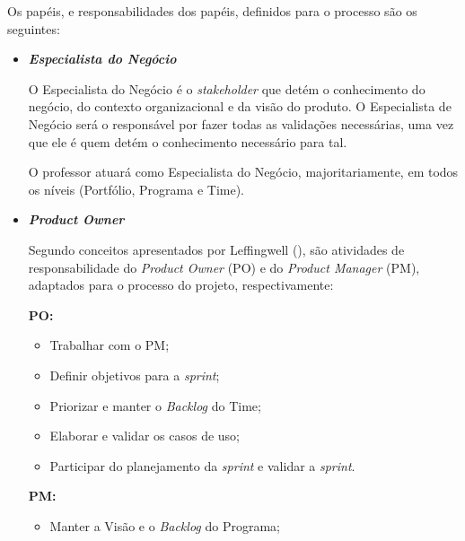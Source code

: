 
  Os papéis, e responsabilidades dos papéis, definidos para o processo são os seguintes:
  
  \begin{itemize}
   
   \item \textbf{\textit{Especialista do Negócio}}
   
      O Especialista do Negócio é o \textit{stakeholder} que detém o conhecimento do negócio, do contexto organizacional
      e da visão do produto. O Especialista de Negócio será o responsável por fazer todas as validações necessárias, uma vez que
      ele é quem detém o conhecimento necessário para tal.
      
      O professor atuará como Especialista do Negócio, majoritariamente, em todos os níveis (Portfólio, Programa e Time).
   
   \item \textbf{\textit{Product Owner}}
      
      Segundo conceitos apresentados por Leffingwell (\citeyear{leffingwell11}),
      são atividades de responsabilidade do \textit{Product Owner} (PO) e do \textit{Product Manager} (PM), 
      adaptados para o processo do projeto, respectivamente:
      
      \textbf{PO:}
      
      \begin{itemize}
       
       \item Trabalhar com o PM;
       
       \item Definir objetivos para a \textit{sprint};
       
       \item Priorizar e manter o \textit{Backlog} do Time;
       
       \item Elaborar e validar os casos de uso;
       
       \item Participar do planejamento da \textit{sprint} e validar a \textit{sprint}.
       
      \end{itemize}
      
      \textbf{PM:}
      
      \begin{itemize}
       
       \item Manter a Visão e o \textit{Backlog} do Programa;
       

\end{itemize}
\end{itemize}
